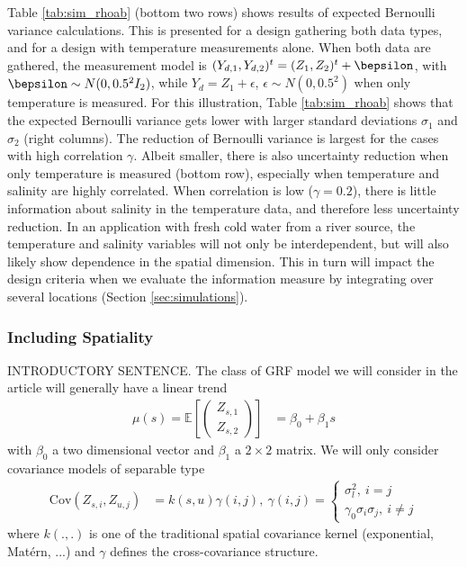 Table \ref{tab:sim_rhoab} (bottom two rows) shows results of expected
Bernoulli variance calculations. This is presented for a design
gathering both data types, and for a design with temperature
measurements alone. When both data are gathered, the measurement model is
$(Y_{d,1},Y_{d,2})^t=(Z_1,Z_2)^t+\bepsilon$, with $\bepsilon \sim N(0,0.5^2I_2)$, while $Y_d=Z_1+\epsilon$, $\epsilon \sim N(0,0.5^2)$ when only temperature is measured.
For this illustration, Table \ref{tab:sim_rhoab} shows that the
expected Bernoulli variance gets lower with larger standard deviations
$\sigma_1$ and $\sigma_2$ (right columns). The reduction of Bernoulli
variance is largest for the cases with high correlation
$\gamma$. Albeit smaller, there is also uncertainty reduction when
only temperature is measured (bottom row), especially when temperature
and salinity are highly correlated. When correlation is low
($\gamma=0.2$), there is little information about salinity in the
temperature data, and therefore less uncertainty reduction. In an
application with fresh cold water from a river source, the temperature
and salinity variables will not only be interdependent, but will also
likely show dependence in the spatial dimension. This in turn will
impact the design criteria when we evaluate the information measure by
integrating over several locations (Section \ref{sec:simulations}).

\subsubsection{Including Spatiality}
INTRODUCTORY SENTENCE.
The class of GRF model we will consider in the article will generally have a linear trend
\begin{align*}
\mu(s)=\mathbb{E}\left[\begin{pmatrix}
Z_{s, 1}\\ Z_{s, 2}
\end{pmatrix}\right] &= \beta_0 + \beta_1 s
\end{align*}
with $\beta_0$ a two dimensional vector and $\beta_1$ a $2\times 2$ matrix. We will only consider covariance models of separable type
\begin{align*}
\textrm{Cov}\left(Z_{s, i}, Z_{u, j}\right) &= k(s, u) \gamma(i, j),~ \gamma(i, j) = \begin{cases} \sigma_l^2,~ i=j\\
   \gamma_0 \sigma_i \sigma_j,~i\neq j
        \end{cases}
\end{align*}
where $k(., .)$ is one of the traditional spatial covariance kernel (exponential, Mat\'{e}rn, ...) and $\gamma$ defines the cross-covariance structure.

